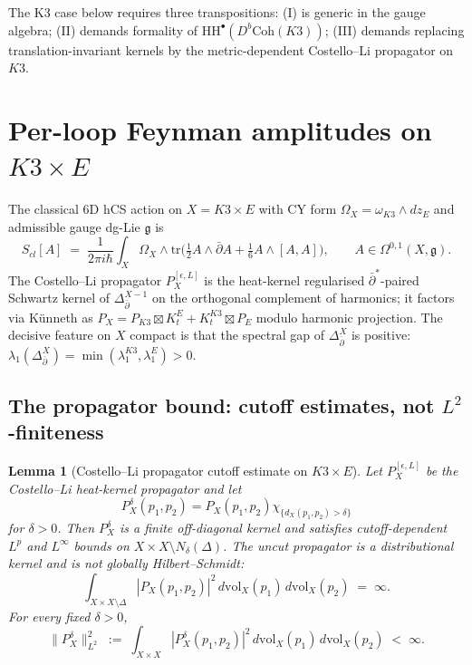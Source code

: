 \documentclass[11pt]{article}
\providecommand{\frakg}{\mathfrak{g}}
\providecommand{\dbar}{\bar{\partial}}
\providecommand{\HH}{\mathrm{HH}}
\providecommand{\Coh}{\mathrm{Coh}}
\newtheorem{lemma}[theorem]{Lemma}
\theoremstyle{definition}\newtheorem{definition}[theorem]{Definition}
\theoremstyle{remark}\newtheorem{remark}[theorem]{Remark}\newtheorem{example}[theorem]{Example}
\begin{document}
The K3 case below requires three transpositions: (I) is generic in the
gauge algebra; (II) demands formality of $\HH^\bullet(D^b\Coh(K3))$;
(III) demands replacing translation-invariant kernels by the
metric-dependent Costello--Li propagator on $K3$.

\section{Per-loop Feynman amplitudes on $K3\times E$}
\label{sec:per-loop-bounds}

The classical $6$D hCS action on $X = K3\times E$ with CY form
$\Omega_X = \omega_{K3}\wedge dz_E$ and admissible gauge dg-Lie $\frakg$
is
\begin{equation}
\label{eq:6d-hcs-action}
S_{cl}[A] \;=\; \frac{1}{2\pi i \hbar}\int_X \Omega_X\wedge \mathrm{tr}\!\bigl(\tfrac12 A\wedge\dbar A + \tfrac16 A\wedge[A,A]\bigr),\qquad A\in\Omega^{0,1}(X,\frakg).
\end{equation}
The Costello--Li propagator $P_X^{[\epsilon,L]}$ is the heat-kernel
regularised $\dbar^{*}$-paired Schwartz kernel of $\Delta_{\dbar}^{X-1}$
on the orthogonal complement of harmonics; it factors via K\"unneth
as $P_X = P_{K3}\boxtimes K_t^E + K_t^{K3}\boxtimes P_E$ modulo harmonic
projection. The decisive feature on $X$ compact is that the spectral
gap of $\Delta_{\dbar}^X$ is positive: $\lambda_1(\Delta_{\dbar}^X) =
\min(\lambda_1^{K3},\lambda_1^E) > 0$.

\subsection{The propagator bound: cutoff estimates, not $L^2$-finiteness}

\begin{lemma}[Costello--Li propagator cutoff estimate on $K3\times E$]
\label{lem:propagator-L2-bound}
Let $P_X^{[\epsilon,L]}$ be the Costello--Li heat-kernel propagator and
let
\[
 P_X^\delta(p_1,p_2)=P_X(p_1,p_2)\chi_{\{d_X(p_1,p_2)>\delta\}}
\]
for $\delta>0$. Then $P_X^\delta$ is a finite off-diagonal kernel and
satisfies cutoff-dependent $L^p$ and $L^\infty$ bounds on
$X\times X\setminus N_\delta(\Delta)$. The uncut propagator is a
distributional kernel and is not globally Hilbert--Schmidt:
\begin{equation}
\label{eq:propagator-L2}
\int_{X\times X\setminus\Delta}|P_X(p_1,p_2)|^2\,d\mathrm{vol}_X(p_1)\,d\mathrm{vol}_X(p_2)
\;=\; \infty.
\end{equation}
For every fixed $\delta>0$,
\begin{equation}
\label{eq:propagator-cutoff-L2}
\|P_X^\delta\|_{L^2}^2 \;:=\;
\int_{X\times X}|P_X^\delta(p_1,p_2)|^2\,d\mathrm{vol}_X(p_1)\,d\mathrm{vol}_X(p_2)
\;<\; \infty.
\end{equation}
\end{lemma}
\end{document}
